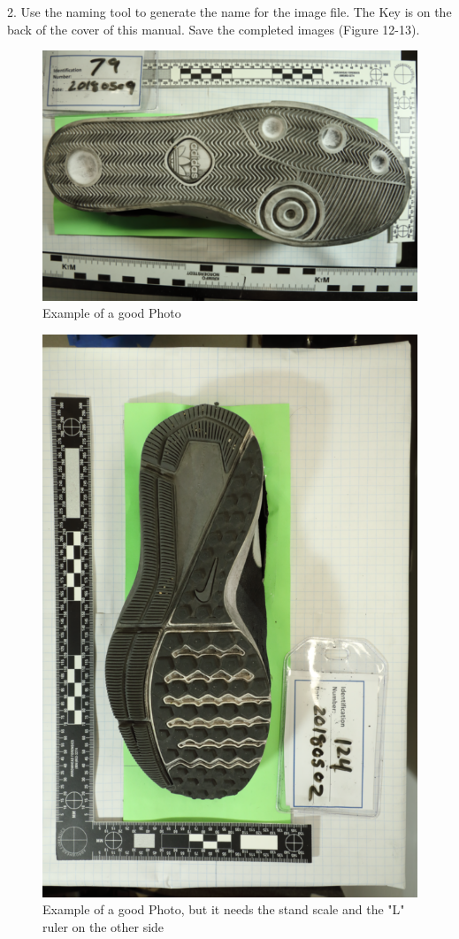 2. Use the naming tool to generate the name for the image file. The Key is on the back of the cover of this manual. Save the completed images (Figure 12-13).

\begin{figure}[!htp]
\centering
\includegraphics[scale=2.0]{New_photo__2_}
\caption{Example of a good Photo}
\label{Image 12}
\end{figure}

\begin{figure}[!htp]
\centering
\includegraphics[scale=1.1, angle=90]{New_Photo}
\caption{Example of a good Photo, but it needs the stand scale and the "L" ruler on the other side}
\label{Image 13}
\end{figure}

